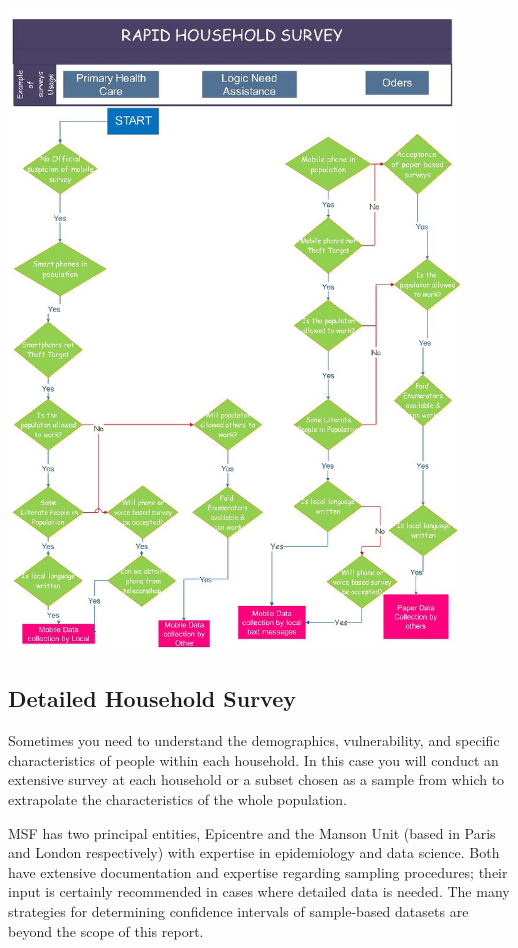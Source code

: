 \documentclass[a4paper,12pt,twoside]{article}
\begin{document}
\includegraphics[width=0.9\textwidth]{images/Rapid_Household_Survey.jpeg}

\subsection{Detailed Household Survey}
Sometimes you need to understand the demographics, vulnerability, and specific characteristics of people within each household. In this case you will conduct an extensive survey at each household or a subset chosen as a sample from which to extrapolate the characteristics of the whole population. 

MSF has two principal entities, Epicentre and the Manson Unit (based in Paris and London respectively) with expertise in epidemiology and data science. Both have extensive documentation and expertise regarding sampling procedures; their input is certainly recommended in cases where detailed data is needed. The many strategies for determining confidence intervals of sample-based datasets are beyond the scope of this report.
\end{document}
